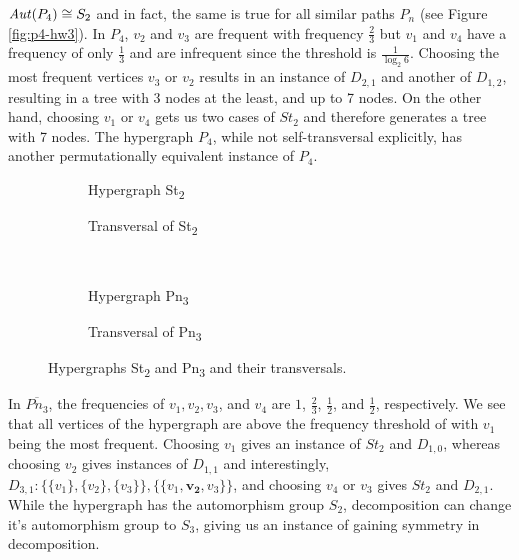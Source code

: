 $\mathit{Aut}(P_4)\cong S_2$ and in fact, the same is true for all similar paths $P_n$ (see Figure \ref{fig:p4-hw3}). In $P_4$, $v_2$ and $v_3$ are frequent with frequency $\frac{2}{3}$ but $v_1$ and $v_4$ have a frequency of only $\frac{1}{3}$ and are infrequent since the threshold is $\frac{1}{\log_2 6}$. Choosing the most frequent vertices $v_3$ or $v_2$ results in an instance of $D_{2,1}$ and another of $D_{1,2}$, resulting in a tree with 3 nodes at the least, and up to 7 nodes. On the other hand, choosing $v_1$ or $v_4$ gets us two cases of $St_2$ and therefore generates a tree with 7 nodes. The hypergraph $P_4$, while not self-transversal explicitly, has another permutationally equivalent instance of $P_4$.

\begin{figure}[tp]
\centering
\begin{subfigure}{0.45\linewidth}\centering\caption{Hypergraph St\textsubscript{2}}\end{subfigure}\hfill
\begin{subfigure}{0.45\linewidth}\centering\caption{Transversal of St\textsubscript{2}}\end{subfigure}\\[8pt]
\begin{subfigure}{0.45\linewidth}\centering\caption{Hypergraph Pn\textsubscript{3}}\end{subfigure}\hfill
\begin{subfigure}{0.45\linewidth}\centering\caption{Transversal of Pn\textsubscript{3}}\end{subfigure}
\caption{Hypergraphs St\textsubscript{2} and Pn\textsubscript{3} and their transversals.}\label{fig:st2-pn3}
\end{figure}

In $\overline{Pn_3}$, the frequencies of $v_1,v_2,v_3$, and $v_4$ are $1$, $\frac{2}{3}$, $\frac{1}{2}$, and $\frac{1}{2}$, respectively. We see that all vertices of the hypergraph are above the frequency threshold of \FKA{} with $v_1$ being the most frequent. Choosing $v_1$ gives an instance of $St_2$ and $D_{1,0}$, whereas choosing $v_2$ gives instances of $D_{1,1}$ and interestingly, $D_{3,1}:\{\{v_1\},\{v_2\},\{v_3\}\},\{\{v_1,\mathbf{v_2},v_3\}\}$, and choosing $v_4$ or $v_3$ gives $St_2$ and $D_{2,1}$. While the hypergraph has the automorphism group $S_2$, decomposition can change it's automorphism group to $S_3$, giving us an instance of gaining symmetry in \FKA{} decomposition.

